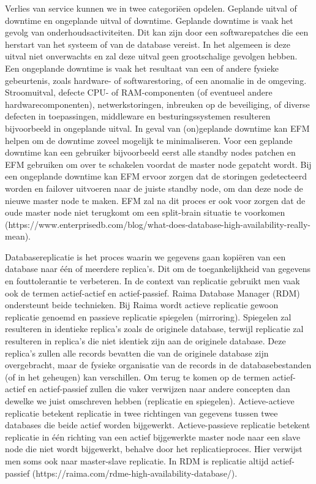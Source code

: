 Verlies van service kunnen we in twee categoriëen opdelen. Geplande uitval of downtime en ongeplande uitval of downtime.
Geplande downtime is vaak het gevolg van onderhoudsactiviteiten. Dit kan zijn door een softwarepatches die een herstart van het systeem of van de database vereist. In het algemeen is deze uitval niet onverwachts en zal deze uitval geen grootschalige gevolgen hebben.
Een ongeplande downtime is vaak het resultaat van een of andere fysieke gebeurtenis, zoals hardware- of softwarestoring, of een anomalie in de omgeving. Stroomuitval, defecte CPU- of RAM-componenten (of eventueel andere hardwarecomponenten), netwerkstoringen, inbreuken op de beveiliging, of diverse defecten in toepassingen, middleware en besturingssystemen resulteren bijvoorbeeld in ongeplande uitval.
In geval van (on)geplande downtime kan EFM helpen om de downtime zoveel mogelijk te minimaliseren. Voor een geplande downtime kan een gebruiker bijvoorbeeld eerst alle standby nodes patchen en EFM gebruiken om over te schakelen voordat de master node gepatcht wordt. Bij een ongeplande downtime kan EFM ervoor zorgen dat de storingen gedetecteerd worden en failover uitvoeren naar de juiste standby node, om dan deze node de nieuwe master node te maken. EFM zal na dit proces er ook voor zorgen dat de oude master node niet terugkomt om een split-brain situatie te voorkomen (https://www.enterprisedb.com/blog/what-does-database-high-availability-really-mean).

Databasereplicatie is het proces waarin we gegevens gaan kopiëren van een database naar één of meerdere replica's. Dit om de toegankelijkheid van gegevens en fouttolerantie te verbeteren.
In de context van replicatie gebruikt men vaak ook de termen actief-actief en actief-passief. Raima Database Manager (RDM) ondersteunt beide technieken. Bij Raima wordt actieve replicatie gewoon replicatie genoemd en passieve replicatie spiegelen (mirroring). Spiegelen zal resulteren in identieke replica's zoals de originele database, terwijl replicatie zal resulteren in replica's die niet identiek zijn aan de originele database. Deze replica's zullen alle records bevatten die van de originele database zijn overgebracht, maar de fysieke organisatie van de records in de databasebestanden (of in het geheugen) kan verschillen.
Om terug te komen op de termen actief-actief en actief-passief zullen die vaker verwijzen naar andere concepten dan dewelke we juist omschreven hebben (replicatie en spiegelen). Actieve-actieve replicatie betekent replicatie in twee richtingen van gegevens tussen twee databases die beide actief worden bijgewerkt. Actieve-passieve replicatie betekent replicatie in één richting van een actief bijgewerkte master node naar een slave node die niet wordt bijgewerkt, behalve door het replicatieproces. Hier verwijst men soms ook naar master-slave replicatie. In RDM is replicatie altijd actief-passief (https://raima.com/rdme-high-availability-database/).

